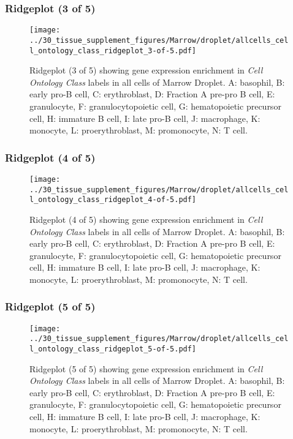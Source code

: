\clearpage

\subsubsection{Ridgeplot (3 of 5)}
\begin{figure}[h]
\centering
\texttt{[image: ../30\_tissue\_supplement\_figures/Marrow/droplet/allcells\_cell\_ontology\_class\_ridgeplot\_3-of-5.pdf]}

\caption{ Ridgeplot (3 of 5)  showing gene expression enrichment in \emph{Cell Ontology Class} labels in all cells of Marrow Droplet. A: basophil, B: early pro-B cell, C: erythroblast, D: Fraction A pre-pro B cell, E: granulocyte, F: granulocytopoietic cell, G: hematopoietic precursor cell, H: immature B cell, I: late pro-B cell, J: macrophage, K: monocyte, L: proerythroblast, M: promonocyte, N: T cell.}
\end{figure}


\clearpage

\subsubsection{Ridgeplot (4 of 5)}
\begin{figure}[h]
\centering
\texttt{[image: ../30\_tissue\_supplement\_figures/Marrow/droplet/allcells\_cell\_ontology\_class\_ridgeplot\_4-of-5.pdf]}

\caption{ Ridgeplot (4 of 5)  showing gene expression enrichment in \emph{Cell Ontology Class} labels in all cells of Marrow Droplet. A: basophil, B: early pro-B cell, C: erythroblast, D: Fraction A pre-pro B cell, E: granulocyte, F: granulocytopoietic cell, G: hematopoietic precursor cell, H: immature B cell, I: late pro-B cell, J: macrophage, K: monocyte, L: proerythroblast, M: promonocyte, N: T cell.}
\end{figure}


\clearpage

\subsubsection{Ridgeplot (5 of 5)}
\begin{figure}[h]
\centering
\texttt{[image: ../30\_tissue\_supplement\_figures/Marrow/droplet/allcells\_cell\_ontology\_class\_ridgeplot\_5-of-5.pdf]}

\caption{ Ridgeplot (5 of 5)  showing gene expression enrichment in \emph{Cell Ontology Class} labels in all cells of Marrow Droplet. A: basophil, B: early pro-B cell, C: erythroblast, D: Fraction A pre-pro B cell, E: granulocyte, F: granulocytopoietic cell, G: hematopoietic precursor cell, H: immature B cell, I: late pro-B cell, J: macrophage, K: monocyte, L: proerythroblast, M: promonocyte, N: T cell.}
\end{figure}


